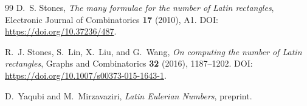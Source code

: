 \documentclass[11pt,a4paper]{amsart}
\newcommand{\1}{\mathbf{1}}
\begin{document}
\begin{thebibliography}{99}
D.~S. Stones,
\newblock \emph{The many formulae for the number of Latin rectangles},
\newblock Electronic Journal of Combinatorics \textbf{17} (2010), A1.
\newblock DOI: \url{https://doi.org/10.37236/487}.

R.~J. Stones, S.~Lin, X.~Liu, and G.~Wang,
\newblock \emph{On computing the number of Latin rectangles},
\newblock Graphs and Combinatorics \textbf{32} (2016), 1187--1202.
\newblock DOI: \url{https://doi.org/10.1007/s00373-015-1643-1}.

D.~Yaqubi and M.~Mirzavaziri,
\newblock \emph{Latin Eulerian Numbers},
\newblock preprint.

\end{thebibliography}
\end{document}
